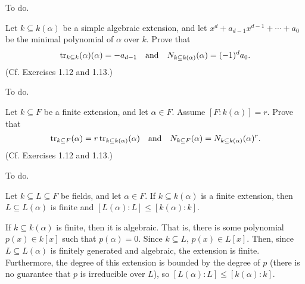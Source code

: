 \documentclass[../../master.tex]{subfiles}
\begin{document}
\begin{solution}
    To do.
\end{solution}

\begin{problem}
    Let $k \subseteq k(\alpha)$ be a simple algebraic extension, and let $x^{d} + a_{d-1}x^{d-1} + \cdots + a_0$ be the minimal polynomial of $\alpha$ over $k$.
    Prove that
    \begin{gather*}
        \operatorname{tr}_{k \subseteq k}(\alpha)(\alpha) = -a_{d-1} \quad \text{and} \quad N_{k \subseteq k(\alpha)}(\alpha) = (-1)^{d}a_0.
    \end{gather*}
    (Cf. Exercises 1.12 and 1.13.)
\end{problem}

\begin{solution}
    To do.
\end{solution}

\begin{problem}
    Let $k \subseteq F$ be a finite extension, and let $\alpha \in F$.
    Assume $[F : k(\alpha)] = r$.
    Prove that
    \begin{gather*}
        \operatorname{tr}_{k \subseteq F}(\alpha) = r \operatorname{tr}_{k \subseteq k(\alpha)}(\alpha) \quad \text{and} \quad N_{k \subseteq F}(\alpha) = N_{k \subseteq k(\alpha)}(\alpha)^{r}.
    \end{gather*}
    (Cf. Exercises 1.12 and 1.13.)
\end{problem}

\begin{solution}
    To do.
\end{solution}

\begin{problem}
    Let $k \subseteq L \subseteq F$ be fields, and let $\alpha \in F$.
    If $k \subseteq k(\alpha)$ is a finite extension, then $L \subseteq L(\alpha)$ is finite and $[L(\alpha) : L] \leq [k(\alpha) : k]$.
\end{problem}

\begin{solution}
    If $k \subseteq k(\alpha)$ is finite, then it is algebraic.
    That is, there is some polynomial $p(x) \in k[x]$ such that $p(\alpha) = 0$.
    Since $k \subseteq L$, $p(x) \in L[x]$.
    Then, since $L \subseteq L(\alpha)$ is finitely generated and algebraic, the extension is finite.
    Furthermore, the degree of this extension is bounded by the degree of $p$ (there is no guarantee that $p$ is irreducible over $L$), so $[L(\alpha) : L] \leq [k(\alpha) : k]$.
\end{solution}
\end{document}
